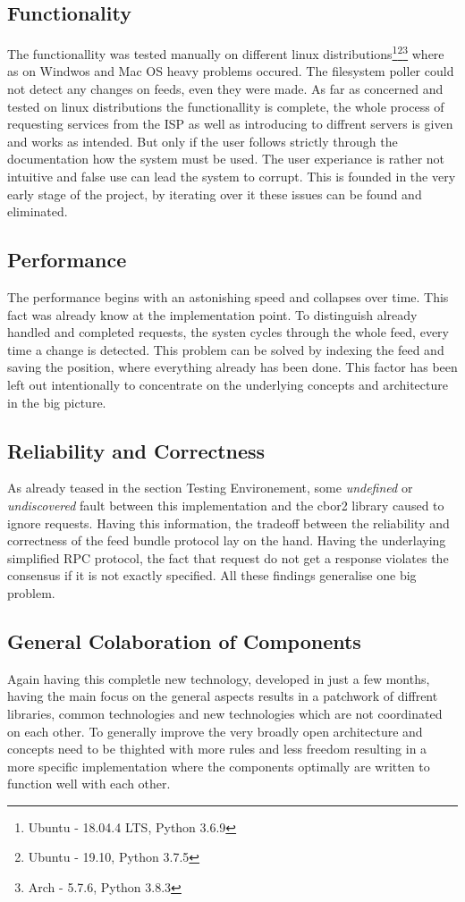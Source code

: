 \subsection{Functionality}
The functionallity was tested manually on different linux distributions\footnote{Ubuntu - 18.04.4 LTS, Python 3.6.9}\footnote{Ubuntu - 19.10, Python 3.7.5}\footnote{Arch - 5.7.6, Python 3.8.3} where as on Windwos and Mac OS heavy problems occured. The filesystem poller could not detect any changes on feeds, even they were made. As far as concerned and tested on linux distributions the functionallity is complete, the whole process of requesting services from the ISP as well as introducing to diffrent servers is given and works as intended. But only if the user follows strictly through the documentation how the system must be used. The user experiance is rather not intuitive and false use can lead the system to corrupt. This is founded in the very early stage of the project, by iterating over it these issues can be found and eliminated.
\subsection{Performance}
The performance begins with an astonishing speed and collapses over time. This fact was already know at the implementation point. To distinguish already handled and completed requests, the systen cycles through the whole feed, every time a change is detected. This problem can be solved by indexing the feed and saving the position, where everything already has been done. This factor has been left out intentionally to concentrate on the underlying concepts and architecture in the big picture.
\subsection{Reliability and Correctness}
As already teased in the section Testing Environement, some \textit{undefined} or \textit{undiscovered} fault between this implementation and the cbor2 library caused to ignore requests. Having this information, the tradeoff between the reliability and correctness of the feed bundle protocol lay on the hand. Having the underlaying simplified RPC protocol, the fact that request do not get a response violates the consensus if it is not exactly specified. All these findings generalise one big problem. 

\subsection{General Colaboration of Components}
Again having this completle new technology, developed in just a few months, having the main focus on the general aspects results in a patchwork of diffrent libraries, common technologies and new technologies which are not coordinated on each other. To generally improve the very broadly open architecture and concepts need to be thighted with more rules and less freedom resulting in a more specific implementation where the components optimally are written to function well with each other.